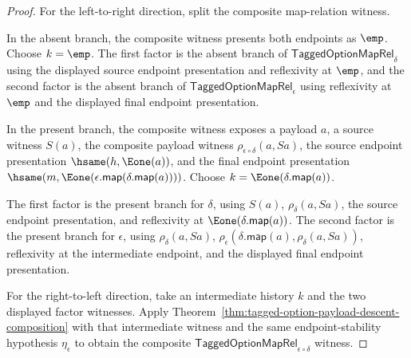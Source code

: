 \begin{proof}
For the left-to-right direction, split the composite map-relation witness.

In the absent branch, the composite witness presents both endpoints as
$\emp$. Choose $k=\emp$. The first factor is the absent branch of
$\mathsf{TaggedOptionMapRel}_{\delta}$ using the displayed source endpoint
presentation and reflexivity at $\emp$, and the second factor is the absent
branch of $\mathsf{TaggedOptionMapRel}_{\epsilon}$ using reflexivity at $\emp$
and the displayed final endpoint presentation.

In the present branch, the composite witness exposes a payload $a$, a source
witness $S(a)$, the composite payload witness
$\rho_{\epsilon\circ\delta}(a,Sa)$, the source endpoint presentation
$\hsame(h,\Eone(a))$, and the final endpoint presentation
$\hsame(m,\Eone(\epsilon.\mathsf{map}(\delta.\mathsf{map}(a))))$. Choose
$k=\Eone(\delta.\mathsf{map}(a))$.

The first factor is the present branch for $\delta$, using $S(a)$,
$\rho_{\delta}(a,Sa)$, the source endpoint presentation, and reflexivity at
$\Eone(\delta.\mathsf{map}(a))$. The second factor is the present branch for
$\epsilon$, using $\rho_{\delta}(a,Sa)$,
$\rho_{\epsilon}(\delta.\mathsf{map}(a),\rho_{\delta}(a,Sa))$, reflexivity at
the intermediate endpoint, and the displayed final endpoint presentation.

For the right-to-left direction, take an intermediate history $k$ and the two
displayed factor witnesses. Apply
Theorem~\ref{thm:tagged-option-payload-descent-composition} with that
intermediate witness and the same endpoint-stability hypothesis
$\eta_{\epsilon}$ to obtain the composite
$\mathsf{TaggedOptionMapRel}_{\epsilon\circ\delta}$ witness.
\end{proof}
